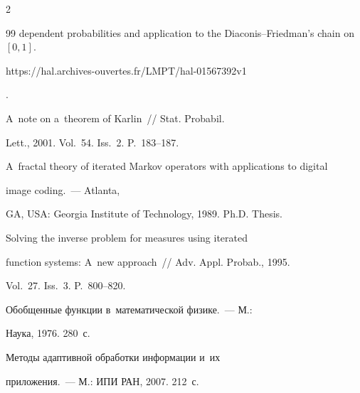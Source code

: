 \begin{multicols}{2}
{{\begin{thebibliography}{99}
dependent probabilities and application to the Diaconis--Friedman's chain on~$[0,1]$. {\sf 


https://hal.archives-ouvertes.fr/LMPT/hal-01567392v1}.


 




   A~note on a~theorem of Karlin~// Stat. Probabil. 


Lett., 2001. Vol.~54. Iss.~2. P.~183--187.




   A~fractal theory of iterated Markov operators with applications to digital 


image coding.~--- Atlanta,


 GA, USA: Georgia Institute of Technology, 1989. Ph.D. Thesis.


 





 




   Solving the inverse problem for measures using iterated 


function systems: A~new approach~// Adv. Appl. Probab., 1995. 


Vol.~27. Iss.~3. P.~800--820.




   Обобщенные функции в~математической физике.~--- М.: 


Наука, 1976. 280~с.




   Методы адаптивной обработки информации и~их  


приложения.~--- М.: ИПИ РАН, 2007. 212~с.





 \end{thebibliography}





 }


 }





\end{multicols}





